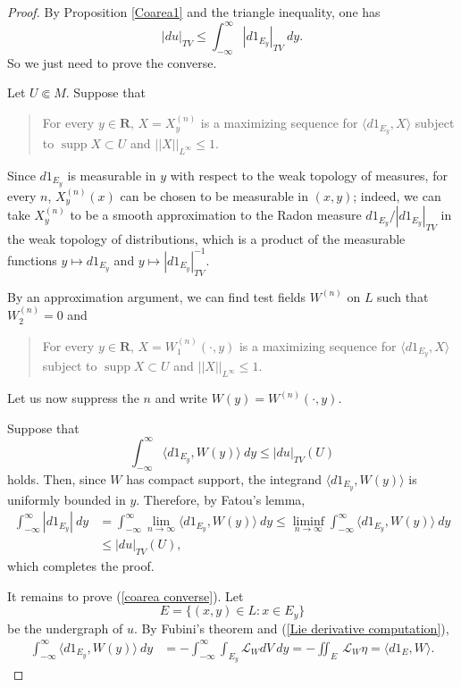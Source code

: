 \documentclass[reqno,12pt,letterpaper]{amsart}
\newcommand{\RR}{\mathbf{R}}
\DeclareMathOperator{\supp}{supp}
\theoremstyle{definition}
\numberwithin{equation}{section}
\begin{document}
\begin{proof}
By Proposition \ref{Coarea1} and the triangle inequality, one has
$$|du|_{TV} \leq \int_{-\infty}^\infty |d1_{E_y}|_{TV} ~dy.$$
So we just need to prove the converse.

Let $U \Subset M$.
Suppose that
\begin{quote}
For every $y \in \RR$, $X = X^{(n)}_y$ is a maximizing sequence for $\langle d1_{E_y}, X\rangle$ subject to $\supp X \subset U$ and $||X||_{L^\infty} \leq 1$.
\end{quote}
Since $d 1_{E_y}$ is measurable in $y$ with respect to the weak topology of measures, for every $n$, $X^{(n)}_y(x)$ can be chosen to be measurable in $(x, y)$; indeed, we can take $X^{(n)}_y$ to be a smooth approximation to the Radon measure $d 1_{E_y}/|d 1_{E_y}|_{TV}$ in the weak topology of distributions, which is a product of the measurable functions $y \mapsto d 1_{E_y}$ and $y \mapsto |d 1_{E_y}|_{TV}^{-1}$.

By an approximation argument, we can find test fields $W^{(n)}$ on $L$ such that $W^{(n)}_2 = 0$ and
\begin{quote}
For every $y \in \RR$, $X = W^{(n)}_1(\cdot, y)$ is a maximizing sequence for $\langle d 1_{E_y}, X\rangle$ subject to $\supp X \subset U$ and $||X||_{L^\infty} \leq 1$.
\end{quote}
Let us now suppress the $n$ and write $W(y) = W^{(n)}(\cdot, y)$.

Suppose that
\begin{equation}
\label{coarea converse}
\int_{-\infty}^\infty \langle d 1_{E_y}, W(y)\rangle ~dy \leq |d u|_{TV}(U)
\end{equation}
holds.
Then, since $W$ has compact support, the integrand $\langle d 1_{E_y}, W(y)\rangle$ is uniformly bounded in $y$.
Therefore, by Fatou's lemma,
\begin{align*}
\int_{-\infty}^\infty |d 1_{E_y}| ~dy &= \int_{-\infty}^\infty \lim_{n \to \infty} \langle d 1_{E_y}, W(y)\rangle ~dy \leq \liminf_{n \to \infty} \int_{-\infty}^\infty \langle d 1_{E_y}, W(y)\rangle ~dy \\
&\leq |d u|_{TV}(U),
\end{align*}
which completes the proof.

It remains to prove (\ref{coarea converse}).
Let
$$E = \{(x, y) \in L: x \in E_y\}$$
be the undergraph of $u$.
By Fubini's theorem and (\ref{Lie derivative computation}),
\begin{align*}
\int_{-\infty}^\infty \langle d 1_{E_y}, W(y)\rangle ~dy &= -\int_{-\infty}^\infty \int_{E_y} \mathcal L_WdV ~dy = -\iint_E ~\mathcal L_W\eta = \langle d 1_E, W\rangle.
\end{align*}


\end{proof}
\end{document}
